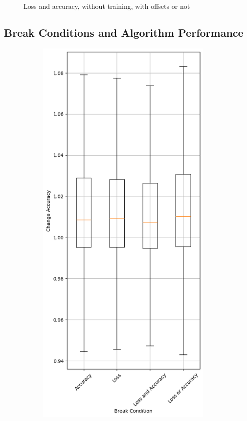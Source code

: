\begin{figure}
\begin{subfigure}{0.5\textwidth}
    \end{subfigure}
    \caption{Loss and accuracy, without training, with offsets or not}
    \label{fig:offset-notraining}
\end{figure}
\subsection{Break Conditions and Algorithm Performance}\label{subsec:break-conditions-and-algorithm-performance}
\begin{figure}
    \begin{subfigure}{0.5\textwidth}
        \centering
        \includegraphics[width=0.95\textwidth]{plots/BreakCondition_Trained_accuracy.png}

\end{subfigure}
\end{figure}
